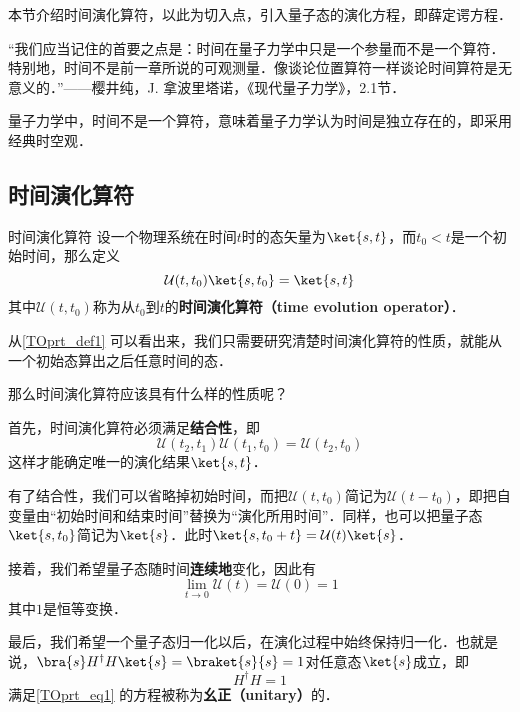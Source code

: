 


本节介绍时间演化算符，以此为切入点，引入量子态的演化方程，即薛定谔方程．


“我们应当记住的首要之点是：时间在量子力学中只是一个参量而不是一个算符．特别地，时间不是前一章所说的可观测量．像谈论位置算符一样谈论时间算符是无意义的．”——樱井纯，J. 拿波里塔诺，《现代量子力学》，2.1节．

量子力学中，时间不是一个算符，意味着量子力学认为时间是独立存在的，即采用经典时空观．


\subsection{时间演化算符}

\begin{definition}{时间演化算符}\label{TOprt_def1}
设一个物理系统在时间$t$时的态矢量为$\ket{s, t}$，而$t_0<t$是一个初始时间，那么定义
\begin{equation}\label{TOprt_eq1}
\mathcal{U}(t, t_0)\ket{s, t_0}=\ket{s, t}
\end{equation}
其中$\mathcal{U}(t, t_0)$称为从$t_0$到$t$的\textbf{时间演化算符（time evolution operator）}．
\end{definition}

从\autoref{TOprt_def1} 可以看出来，我们只需要研究清楚时间演化算符的性质，就能从一个初始态算出之后任意时间的态．

那么时间演化算符应该具有什么样的性质呢？


首先，时间演化算符必须满足\textbf{结合性}，即
\begin{equation}\label{TOprt_eq2}
\mathcal{U}(t_2, t_1)\mathcal{U}(t_1, t_0) = \mathcal{U}(t_2, t_0)
\end{equation}
这样才能确定唯一的演化结果$\ket{s, t}$．

有了结合性，我们可以省略掉初始时间，而把$\mathcal{U}(t, t_0)$简记为$\mathcal{U}(t-t_0)$，即把自变量由“初始时间和结束时间”替换为“演化所用时间”．同样，也可以把量子态$\ket{s, t_0}$简记为$\ket{s}$．此时$\ket{s, t_0+t}=\mathcal{U}(t)\ket{s}$．

接着，我们希望量子态随时间\textbf{连续地}变化，因此有
\begin{equation}\label{TOprt_eq3}
\lim_{t\to 0}\mathcal{U}(t) = \mathcal{U}(0) = 1
\end{equation}
其中$1$是恒等变换．

最后，我们希望一个量子态归一化以后，在演化过程中始终保持归一化．也就是说，$\bra{s}H^\dagger H\ket{s}=\braket{s}{s}=1$对任意态$\ket{s}$成立，即
\begin{equation}\label{TOprt_eq4}
H^\dagger H=1
\end{equation}
满足\autoref{TOprt_eq1} 的方程被称为\textbf{幺正（unitary）}的．



